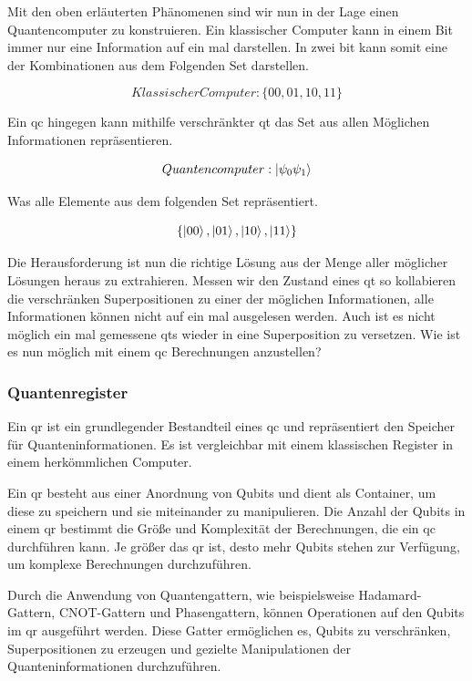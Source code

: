 Mit den oben erläuterten Phänomenen sind wir nun in der Lage einen Quantencomputer zu konstruieren. Ein klassischer Computer kann in einem Bit immer nur eine Information auf ein mal darstellen. In zwei bit kann somit eine der Kombinationen aus dem Folgenden Set darstellen.

\begin{equation}
    Klassischer Computer: \{00, 01, 10, 11\}
\end{equation}

Ein \ac{qc} hingegen kann mithilfe verschränkter \ac{qt} das Set aus allen Möglichen Informationen repräsentieren.

\begin{equation}
    Quantencomputer: \ket{\psi_0 \psi_1} 
\end{equation}

Was alle Elemente aus dem folgenden Set repräsentiert.

\begin{equation}
    \{ \ket{00}, \ket{01}, \ket{10}, \ket{11} \}
\end{equation} \cite[142]{steane_quantum_1998}

Die Herausforderung ist nun die richtige Lösung aus der Menge aller möglicher Lösungen heraus zu extrahieren. Messen wir den Zustand eines \ac{qt} so kollabieren die verschränken Superpositionen zu einer der möglichen Informationen, alle Informationen können nicht auf ein mal ausgelesen werden. Auch ist es nicht möglich ein mal gemessene \ac{qt}s wieder in eine Superposition zu versetzen. Wie ist es nun möglich mit einem \ac{qc} Berechnungen anzustellen?

\subsubsection{Quantenregister}
Ein \ac{qr} ist ein grundlegender Bestandteil eines \ac{qc} und repräsentiert den Speicher für Quanteninformationen. Es ist vergleichbar mit einem klassischen Register in einem herkömmlichen Computer.

Ein \ac{qr} besteht aus einer Anordnung von Qubits und dient als Container, um diese zu speichern und sie miteinander zu manipulieren. Die Anzahl der Qubits in einem \ac{qr} bestimmt die Größe und Komplexität der Berechnungen, die ein \ac{qc} durchführen kann. Je größer das \ac{qr} ist, desto mehr Qubits stehen zur Verfügung, um komplexe Berechnungen durchzuführen.

Durch die Anwendung von Quantengattern, wie beispielsweise Hadamard-Gattern, CNOT-Gattern und Phasengattern, können Operationen auf den Qubits im \ac{qr} ausgeführt werden. Diese Gatter ermöglichen es, Qubits zu verschränken, Superpositionen zu erzeugen und gezielte Manipulationen der Quanteninformationen durchzuführen.

